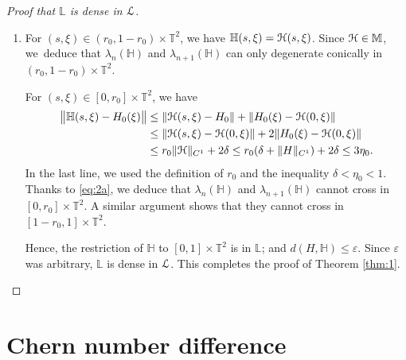 \documentclass[11pt]{article}
\numberwithin{equation}{section}
\let\pazocal\EuScript
\theoremstyle{definition}
\newcommand{\LL}{{\pazocal{L}}}
\newcommand{\HH}{\pazocal{H}}
\newcommand{\Hh}{{\mathbb{H}}}
\newcommand{\Ll}{\mathbb{L}}
\newcommand{\Mm}{\mathbb{M}}
\newcommand{\Tt}{{\mathbb{T}}}
\let\epsi\varepsilon
\begin{document}
\begin{proof}[Proof that $\Ll$ is dense in $\LL$]
\begin{enumerate}
\item
For $(s,\xi) \in (r_0,1-r_0) \times \Tt^2$, we have $\Hh(s,\xi) = \HH(s,\xi)$. Since $\HH \in \Mm$, we~deduce that $\lambda_n(\Hh)$ and $\lambda_{n+1}(\Hh)$ can only degenerate conically in $(r_0,1-r_0) \times \Tt^2$.

For $(s,\xi) \in [0,r_0] \times \Tt^2$, we have
\[
\begin{split}
\big\| \Hh(s,\xi) - H_0(\xi) \big\| &\leq \| \HH(s,\xi)-H_0 \| + \| H_0(\xi) -\HH(0,\xi) \|
\\
&\leq \| \HH(s,\xi)-\HH(0,\xi) \| + 2\| H_0(\xi) -\HH(0,\xi) \|
\\
&\leq r_0 \| \HH \|_{C^1} + 2 \delta \leq r_0 (\delta + \|H\|_{C^1}) + 2 \delta \leq 3\eta_0.
\end{split}
\]
In the last line, we used the definition of $r_0$ and the inequality $\delta < \eta_0 < 1$. Thanks to \eqref{eq:2a}, we deduce that $\lambda_n(\Hh)$ and $\lambda_{n+1}(\Hh)$ cannot cross in $[0,r_0] \times \Tt^2$. A similar argument shows that they cannot cross in $[1-r_0,1] \times \Tt^2$.

Hence, the restriction of $\Hh$ to $[0,1] \times \Tt^2$ is in $\Ll$; and $d(H,\Hh) \leq \epsi$. Since $\epsi$ was arbitrary, $\Ll$ is dense in $\LL$. This completes the proof of Theorem \ref{thm:1}.\qedhere
\end{enumerate}
\end{proof}

\section{Chern number difference}\label{sec:5}
\end{document}
